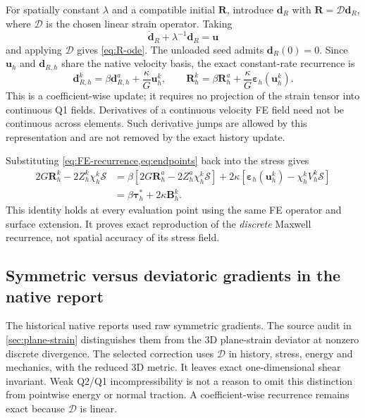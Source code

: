 \documentclass[11pt,a4paper]{article}
\newcommand{\Smat}{\bm{\mathcal S}}
\newcommand{\strain}{\bm\varepsilon}
\newcommand{\tauv}{\bm\tau}
\newcommand{\R}{\bm R}
\begin{document}
For spatially constant $\lambda$ and a compatible initial $\R$, introduce
$\bm d_R$ with $\R=\mathcal D\bm d_R$, where $\mathcal D$ is the chosen
linear strain operator. Taking
\begin{equation}
 \dot{\bm d}_R+\lambda^{-1}\bm d_R=\bm u
\end{equation}
and applying $\mathcal D$ gives \cref{eq:R-ode}. The unloaded seed admits
$\bm d_R(0)=0$. Since $\bm u_h$ and $\bm d_{R,h}$ share the native velocity basis,
the exact constant-rate recurrence is
\begin{equation}
 \boxed{\bm d_{R,h}^k=\beta\bm d_{R,h}^a+\frac\kappa G\bm u_h^k,
 \qquad\R_h^k=\beta\R_h^a+\frac\kappa G\strain_h(\bm u_h^k).}
 \label{eq:FE-recurrence}
\end{equation}
This is a coefficient-wise update; it requires no projection of the strain
tensor into continuous Q1 fields. Derivatives of a continuous velocity FE field
need not be continuous across elements. Such derivative jumps are allowed by
this representation and are not removed by the exact history update.

Substituting \cref{eq:FE-recurrence,eq:endpoints} back into the stress gives
\begin{align}
 2G\R_h^k-2Z_h^k\chi_h^k\Smat
 &=\beta[2G\R_h^a-2Z_h^a\chi_h^k\Smat]
      +2\kappa[\strain_h(\bm u_h^k)-\chi_h^k V_h^k\Smat]\nonumber\\
 &=\beta\tauv_h^*+2\kappa\bm B_h^k.
 \label{eq:FE-Maxwell-equivalence}
\end{align}
This identity holds at every evaluation point using the same FE operator and
surface extension. It proves exact reproduction of the \emph{discrete}
Maxwell recurrence, not spatial accuracy of its stress field.

\subsection{Symmetric versus deviatoric gradients in the native report}
\label{sec:trace}

The historical native reports used raw symmetric gradients. The source audit
in \cref{sec:plane-strain} distinguishes them from the 3D plane-strain deviator
at nonzero discrete divergence. The selected correction uses $\mathcal D$
in history, stress, energy and mechanics, with the reduced 3D metric. It leaves
exact one-dimensional shear invariant. Weak Q2/Q1 incompressibility is not a
reason to omit this distinction from pointwise energy or normal traction.
A coefficient-wise recurrence remains exact because $\mathcal D$ is linear.
\end{document}
